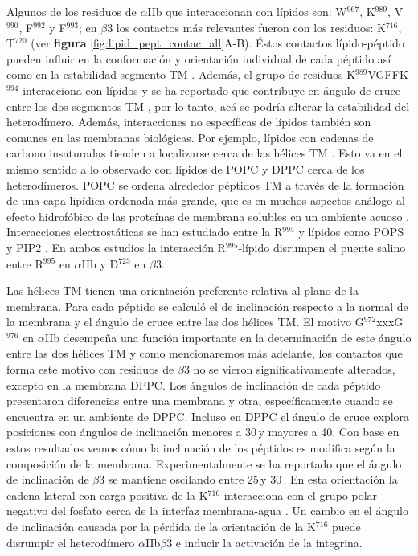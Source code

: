 	 Algunos de los residuos de $\alpha$IIb que interaccionan con lípidos son: W$^{967}$, K$^{989}$, V$^{990}$, F$^{992}$ y F$^{993}$; en $\beta$3 los contactos más relevantes fueron con los residuos: K$^{716}$, T$^{720}$ (ver \textbf{figura} \ref{fig:lipid_pept_contac_all}A-B). Éstos contactos lípido-péptido pueden influir en la conformación y orientación individual de cada péptido así como en la estabilidad segmento TM \citep{Stangl2015}. Además, el grupo de residuos K$^{989}$VGFFK$^{994}$ interacciona con lípidos y se ha reportado que contribuye en ángulo de cruce entre los dos segmentos TM \citep{Lau2008,Zhu2009}, por lo tanto, acá se podría alterar la estabilidad del heterodímero. Además, interacciones no específicas de lípidos también son comunes en las membranas biológicas. Por ejemplo, lípidos con cadenas de carbono insaturadas tienden a localizarse cerca de las hélices TM \citep{Flinner2015}. Esto va en el mismo sentido a lo observado con lípidos de POPC y DPPC cerca de los heterodímeros. POPC se ordena alrededor péptidos TM a través de la formación de una capa lipídica ordenada más grande, que es en muchos aspectos análogo al efecto hidrofóbico de las proteínas de membrana solubles en un ambiente acuoso \citep{Bocharov2017}. Interacciones electrostáticas se han estudiado entre la R$^{995}$ y lípidos como POPS y PIP2 \citep{Orowski2015, Schmidt2015}. En ambos estudios la interacción R$^{995}$-lípido disrumpen el puente salino entre R$^{995}$ en $\alpha$IIb y D$^{723}$ en $\beta$3.

	Las hélices TM tienen una orientación preferente relativa al plano de la membrana. Para cada péptido se calculó el de inclinación respecto a la normal de la membrana y el ángulo de cruce entre las dos hélices TM.  El motivo G$^{972}$xxxG$^{976}$ en $\alpha$IIb desempeña una función importante en la determinación de este ángulo entre las dos hélices TM y como mencionaremos más adelante, los contactos que forma este motivo con residuos de $\beta$3 no se vieron significativamente alterados, excepto en la membrana DPPC. Los ángulos de inclinación de cada péptido presentaron diferencias entre una membrana y otra, específicamente cuando se encuentra en un ambiente de DPPC. Incluso en DPPC el ángulo de cruce explora posiciones con ángulos de inclinación menores a 30\textdegree \,y mayores a 40\textdegree . Con base en estos resultados vemos cómo la inclinación de los péptidos es modifica según la composición de la membrana. 
Experimentalmente se ha reportado que el ángulo de inclinación de $\beta$3 se mantiene oscilando entre 25\textdegree \,y 30\textdegree \,. En esta orientación la cadena lateral con carga positiva de la K$^{716}$  interacciona con el grupo polar negativo del fosfato cerca de la interfaz membrana-agua \citep{Lagarrigue2016}. Un cambio en el ángulo de inclinación causada por la pérdida de la orientación de la K$^{716}$ puede disrumpir el heterodímero $\alpha$IIb$\beta$3 e inducir la activación de la integrina. 

